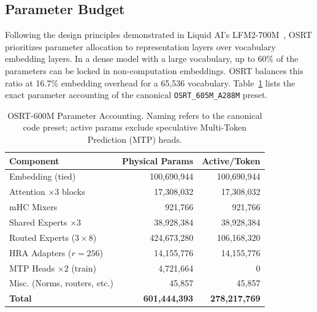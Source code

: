 \documentclass[11pt,twocolumn]{article}
\begin{document}
\subsection{Parameter Budget}
Following the design principles demonstrated in Liquid AI's LFM2-700M~\cite{liquid2025}, OSRT prioritizes parameter allocation to representation layers over vocabulary embedding layers. In a dense model with a large vocabulary, up to 60\% of the parameters can be locked in non-computation embeddings. OSRT balances this ratio at 16.7\% embedding overhead for a 65,536 vocabulary. Table~\ref{tab:budget} lists the exact parameter accounting of the canonical \texttt{OSRT\_605M\_A288M} preset.

\begin{table}[t]
\centering
\small
\begin{tabular}{lrr}
\toprule
\textbf{Component} & \textbf{Physical Params} & \textbf{Active/Token} \\
\midrule
Embedding (tied) & 100,690,944 & 100,690,944 \\
Attention $\times 3$ blocks & 17,308,032 & 17,308,032 \\
mHC Mixers & 921,766 & 921,766 \\
Shared Experts $\times 3$ & 38,928,384 & 38,928,384 \\
Routed Experts ($3 \times 8$) & 424,673,280 & 106,168,320 \\
HRA Adapters ($r=256$) & 14,155,776 & 14,155,776 \\
MTP Heads $\times 2$ (train) & 4,721,664 & 0 \\
Misc. (Norms, routers, etc.) & 45,857 & 45,857 \\
\midrule
\textbf{Total} & \textbf{601,444,393} & \textbf{278,217,769} \\
\bottomrule
\end{tabular}
\caption{OSRT-600M Parameter Accounting. Naming refers to the canonical code preset; active params exclude speculative Multi-Token Prediction (MTP) heads.}
\label{tab:budget}
\end{table}
\end{document}
